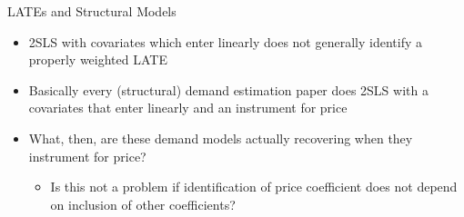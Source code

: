 \documentclass[10pt, xcolor=dvipsnames]{beamer}
\begin{document}
\begin{frame}{LATEs and Structural Models}
    \begin{itemize}
        \item 2SLS with covariates which enter linearly does not generally identify a properly weighted LATE
        \item Basically every (structural) demand estimation paper does 2SLS with a covariates that enter linearly and an instrument for price
        \item What, then, are these demand models actually recovering when they instrument for price?
        \begin{itemize}
            \item Is this not a problem if identification of price coefficient does not depend on inclusion of other coefficients?
        \end{itemize}
    \end{itemize}
\end{frame}
\end{document}
